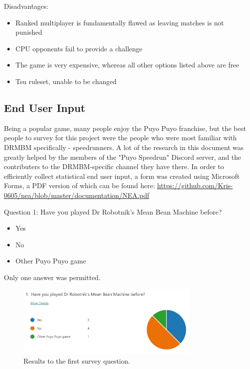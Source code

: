 \documentclass{article}
\begin{document}
Disadvantages: 

\begin{itemize}
    \renewcommand\labelitemi{--}
    \item Ranked multiplayer is fundamentally flawed as leaving matches is not punished
    \item CPU opponents fail to provide a challenge
    \item The game is very expensive, whereas all other options listed above are free
    \item Tsu ruleset, unable to be changed
\end{itemize}

\subsection{End User Input}

Being a popular game, many people enjoy the Puyo Puyo franchise, but the best people to survey for this project were the people who were most familiar with DRMBM specifically - speedrunners. A lot of the research in this document was greatly helped by the members of the "Puyo Speedrun" Discord server, and the contributers to the DRMBM-specific channel they have there.
In order to efficiently collect statistical end user input, a form was created using Microsoft Forms, a PDF version of which can be found here: \href{https://github.com/Kris-0605/nea/blob/master/documentation/NEA.pdf}{https://github.com/Kris-0605/nea/blob/master/documentation/NEA.pdf}

Question 1: Have you played Dr Robotnik's Mean Bean Machine before?
\begin{itemize}
    \renewcommand\labelitemi{--}
    \item Yes
    \item No
    \item Other Puyo Puyo game
\end{itemize}
Only one answer was permitted.

\begin{figure}[h]
    \centering
    \includegraphics[width=0.8\textwidth]{survey1.png}
    \caption{\label{fig:survey1}Results to the first survey question.}
\end{figure}
\end{document}

